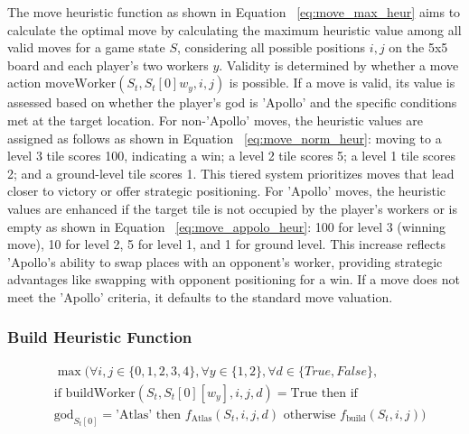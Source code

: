 \documentclass{telkomnika}
\begin{document}
The move heuristic function as shown in Equation ~\ref{eq:move_max_heur} aims to calculate the optimal move by calculating the maximum heuristic value among all valid moves for a game state \( S \), considering all possible positions \( i, j \) on the 5x5 board and each player's two workers \( y \). Validity is determined by whether a move action \( \text{moveWorker}(S_t, S_t[0]w_y, i, j) \) is possible. If a move is valid, its value is assessed based on whether the player's god is 'Apollo' and the specific conditions met at the target location. For non-'Apollo' moves, the heuristic values are assigned as follows as shown in Equation ~\ref{eq:move_norm_heur}: moving to a level 3 tile scores 100, indicating a win; a level 2 tile scores 5; a level 1 tile scores 2; and a ground-level tile scores 1. This tiered system prioritizes moves that lead closer to victory or offer strategic positioning. For 'Apollo' moves, the heuristic values are enhanced if the target tile is not occupied by the player's workers or is empty as shown in Equation ~\ref{eq:move_appolo_heur}: 100 for level 3 (winning move), 10 for level 2, 5 for level 1, and 1 for ground level. This increase reflects 'Apollo's ability to swap places with an opponent's worker, providing strategic advantages like swapping with opponent positioning for a win. If a move does not meet the 'Apollo' criteria, it defaults to the standard move valuation.

\subsubsection {Build Heuristic Function}
\begin{equation}
 \begin{aligned}
    &\max(\forall i,j \in \{0, 1, 2, 3, 4\}, \forall y \in \{1, 2\}, \forall d \in \{True, False\},\\
    &\text{if } \text{buildWorker}(S_t, S_t[0][w_y], i, j, d) = \text{True} \text{ then if } \\
    &\text{god}_{S_t[0]} = \text{'Atlas'} \text{ then } f_{\text{Atlas}}(S_t, i, j,d) \text{ otherwise } f_{\text{build}}(S_t, i, j))
 \end{aligned}
\label{eq:build_max_heur}
\end{equation}
\end{document}
